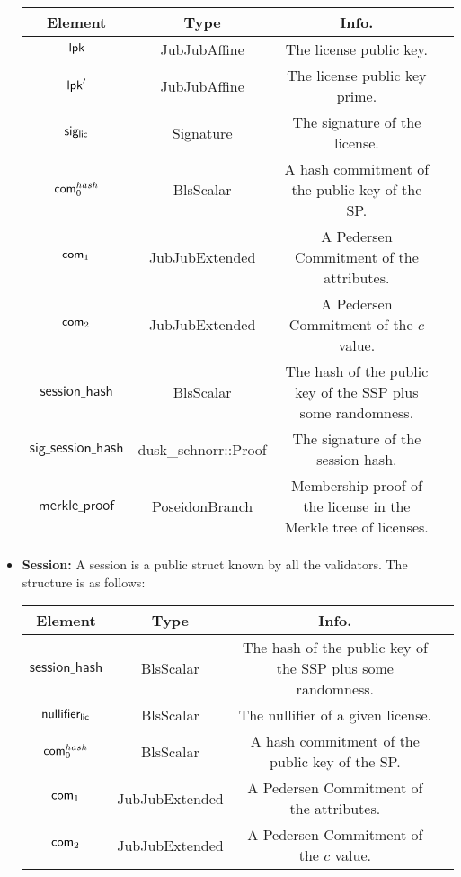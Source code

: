 \begin{itemize}
    \begin{center}
        \begin{tabular}{ |c|c|c|c| } 
        \hline
        \textbf{Element} & \textbf{Type} & \textbf{Info.} \\
        \hline
        $\mathsf{lpk}$ & JubJubAffine & The license public key.\\ 
        $\mathsf{lpk}'$ & JubJubAffine & The license public key prime.\\ 
        $\mathsf{sig_{lic}}$ & Signature & The signature of the license. \\ 
        $\mathsf{com}_0^{hash}$ & BlsScalar & A hash commitment of the public key of the SP. \\ 
        $\mathsf{com}_1$ & JubJubExtended & A Pedersen Commitment of the attributes. \\ 
        $\mathsf{com}_2$ & JubJubExtended & A Pedersen Commitment of the $c$ value. \\ 
        $\mathsf{session\_hash}$ & BlsScalar & The hash of the public key of the SSP plus some randomness. \\ 
        $\mathsf{sig\_session\_hash}$ & dusk\_schnorr::Proof & The signature of the session hash. \\ 
        $\mathsf{merkle\_proof}$ & PoseidonBranch & Membership proof of the license in the Merkle tree of licenses. \\ 

        \hline
        \end{tabular}
    \end{center}

    \item \textbf{Session:} A session is a public struct known by all the validators. The structure is as follows:

    \begin{center}
        \begin{tabular}{ |c|c|c|c| } 
        \hline
        \textbf{Element} & \textbf{Type} & \textbf{Info.} \\
        \hline
        $\mathsf{session\_hash}$ & BlsScalar & The hash of the public key of the SSP plus some randomness. \\ 
        $\mathsf{nullifier_{lic}}$ & BlsScalar & The nullifier of a given license. \\ 
        $\mathsf{com}_0^{hash}$ & BlsScalar & A hash commitment of the public key of the SP. \\ 
        $\mathsf{com}_1$ & JubJubExtended & A Pedersen Commitment of the attributes. \\ 
        $\mathsf{com}_2$ & JubJubExtended & A Pedersen Commitment of the $c$ value. \\ 
        \hline
        \end{tabular}
    \end{center}


\end{itemize}
